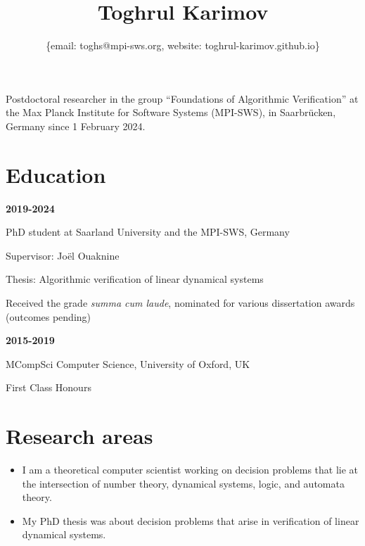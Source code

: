 \documentclass{article}
\title{\bfseries\Huge Toghrul Karimov}
\author{\{email: toghs@mpi-sws.org, website: toghrul-karimov.github.io\}}
\date{}
\begin{document}
	\maketitle
	
	Postdoctoral researcher in the group ``Foundations of Algorithmic Verification'' at the Max Planck Institute for Software Systems (MPI-SWS), in Saarbr\"ucken, Germany since 1 February 2024.
		
	\section*{Education}
		\begin{minipage}{0.3\textwidth}
			\hspace{0.5cm} \textbf{2019-2024}
		\end{minipage}
		\vspace*{0.25cm}
		\begin{minipage}{0.7\textwidth}
			PhD student at Saarland University and the MPI-SWS, Germany
			
			\vspace*{0.2cm}
			Supervisor: Jo\"el Ouaknine 
			
			\vspace*{0.2cm}
			Thesis: Algorithmic verification of linear dynamical systems
			
			\vspace*{0.2cm}
			Received the grade \emph{summa cum laude}, nominated for various dissertation awards (outcomes pending)
                \vspace{0.3cm}
		\end{minipage}
		\vspace{0.85cm}
		\begin{minipage}{0.3\textwidth}
		\hspace{0.5cm} \textbf{2015-2019}
	\end{minipage}
	\begin{minipage}{0.7\textwidth}
		MCompSci Computer Science, University of Oxford, UK
		
		\vspace*{0.2cm}
		First Class Honours
	\end{minipage}
	\section*{Research areas}
	\begin{itemize}
		\item I am a theoretical computer scientist working on decision problems that lie at the intersection of number theory, dynamical systems, logic, and automata theory.
		\item My PhD thesis was about decision problems that arise in verification of linear dynamical systems.
	\end{itemize}
	
\end{document}

